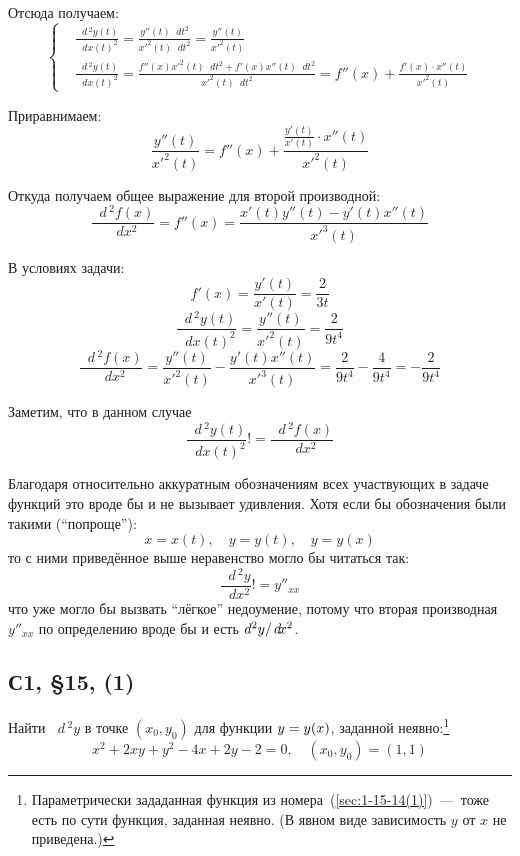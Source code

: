 \documentclass[a4paper,12pt]{article}
\newcommand{\diff}{\mathop{}\!d\!}
\begin{document}
\begin{solution}
    Отсюда получаем:
    \[
      \left\{
        \begin{aligned}
          &\frac{\diff\,^2 y(t)}{\diff x(t)^2}
            = \frac{y''(t) \diff t^2}{x'^2(t) \diff t^2}
            = \frac{y''(t)}{x'^2(t)}\\
          & \frac{\diff\,^2 y(t)}{\diff x(t)^2}
            = \frac{f''(x) x'^2(t) \diff t^2 + f'(x) x''(t) \diff t^2}{x'^2(t) \diff t^2}
            = f''(x) + \frac{f'(x) \cdot x''(t)}{x'^2(t)}
        \end{aligned}
      \right.
    \]

    Приравнимаем:
    \[
      \frac{y''(t)}{x'^2(t)} = f''(x) + \frac{\frac{y'(t)}{x'(t)} \cdot x''(t)}{x'^2(t)}
    \]

    Откуда получаем общее выражение для второй производной:
    \[
      \frac{\diff\,^2 f(x)}{\diff x^2} = f''(x) = \frac{x'(t) y''(t) - y'(t) x''(t)}{x'^3(t)}
    \]

    В условиях задачи:
    \[
      f'(x) = \frac{y'(t)}{x'(t)} = \frac{2}{3t}
    \]
    \[
      \frac{\diff\,^2 y(t)}{\diff x(t)^2} = \frac{y''(t)}{x'^2(t)} = \frac{2}{9 t^4}
    \]
    \[
      \frac{\diff\,^2 f(x)}{\diff x^2} = \frac{y''(t)}{x'^2(t)} - \frac{y'(t) x''(t)}{x'^3(t)}
        = \frac{2}{9 t^4} - \frac{4}{9 t^4}
        = -\frac{2}{9 t^4}
    \]

    Заметим, что в данном случае
    \[
      \frac{\diff\,^2 y(t)}{\diff x(t)^2} != \frac{\diff\,^2 f(x)}{\diff x^2}  %
    \]
    
    Благодаря относительно аккуратным обозначениям всех участвующих в задаче функций это вроде бы и не вызывает удивления.
    Хотя если бы обозначения были такими (``попроще''):
    \[
      x = x(t),\quad y = y(t),\quad y = y(x)
    \]
    то с ними приведённое выше неравенство могло бы читаться так:
    \[
      \frac{\diff\,^2 y}{\diff x^2} != y''_{xx}
    \]
    что уже могло бы вызвать ``лёгкое'' недоумение, потому что вторая производная $y''_{xx}$ по определению вроде бы и есть $\diff\,^2 y \hm/ \diff x^2$.
  \end{solution}


  \subsection{С1, \S 15, (1)}

  Найти $\diff\,^2 y$ в точке $(x_0, y_0)$ для функции $y \hm= y(x)$, заданной неявно:\footnote{
    Параметрически зададанная функция из номера~(\ref{sec:1-15-14(1)})~---~тоже есть по сути функция, заданная неявно.
    (В явном виде зависимость $y$ от $x$ не приведена.)
  }
  \[
    x^2 + 2xy + y^2 - 4x + 2y - 2 = 0,\quad (x_0, y_0) = (1, 1)
  \]
  
\end{document}
